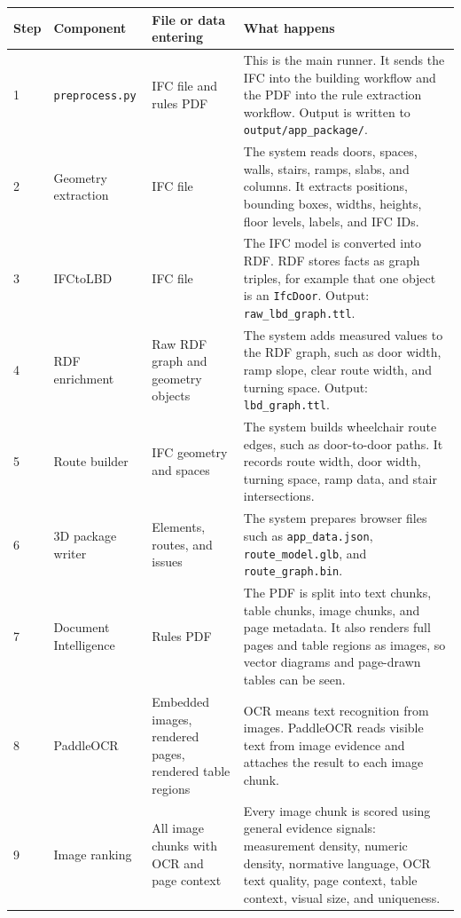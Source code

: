 \documentclass[11pt,a4paper]{article}
\begin{document}
\begin{longtable}{|p{1.2cm}|p{3.5cm}|p{4.2cm}|p{6.3cm}|}
\hline
\textbf{Step} & \textbf{Component} & \textbf{File or data entering} & \textbf{What happens} \\
\hline
1 & \texttt{preprocess.py} & IFC file and rules PDF & This is the main runner. It sends the IFC into the building workflow and the PDF into the rule extraction workflow. Output is written to \texttt{output/app\_package/}. \\
\hline
2 & Geometry extraction & IFC file & The system reads doors, spaces, walls, stairs, ramps, slabs, and columns. It extracts positions, bounding boxes, widths, heights, floor levels, labels, and IFC IDs. \\
\hline
3 & IFCtoLBD & IFC file & The IFC model is converted into RDF. RDF stores facts as graph triples, for example that one object is an \texttt{IfcDoor}. Output: \texttt{raw\_lbd\_graph.ttl}. \\
\hline
4 & RDF enrichment & Raw RDF graph and geometry objects & The system adds measured values to the RDF graph, such as door width, ramp slope, clear route width, and turning space. Output: \texttt{lbd\_graph.ttl}. \\
\hline
5 & Route builder & IFC geometry and spaces & The system builds wheelchair route edges, such as door-to-door paths. It records route width, door width, turning space, ramp data, and stair intersections. \\
\hline
6 & 3D package writer & Elements, routes, and issues & The system prepares browser files such as \texttt{app\_data.json}, \texttt{route\_model.glb}, and \texttt{route\_graph.bin}. \\
\hline
7 & Document Intelligence & Rules PDF & The PDF is split into text chunks, table chunks, image chunks, and page metadata. It also renders full pages and table regions as images, so vector diagrams and page-drawn tables can be seen. \\
\hline
8 & PaddleOCR & Embedded images, rendered pages, rendered table regions & OCR means text recognition from images. PaddleOCR reads visible text from image evidence and attaches the result to each image chunk. \\
\hline
9 & Image ranking & All image chunks with OCR and page context & Every image chunk is scored using general evidence signals: measurement density, numeric density, normative language, OCR text quality, page context, table context, visual size, and uniqueness. \\
\hline

\end{longtable}
\end{document}
